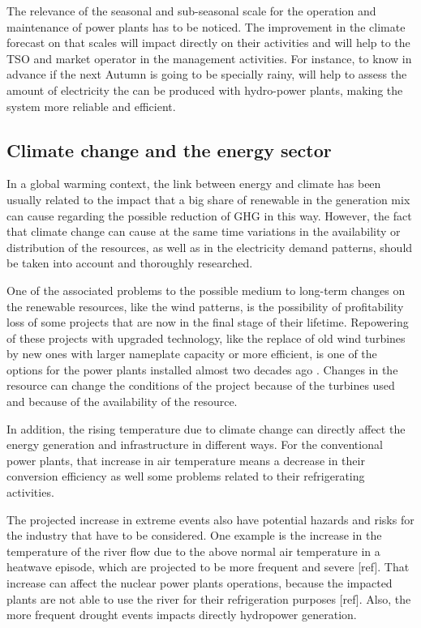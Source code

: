 The relevance of the seasonal and sub-seasonal scale for the operation and maintenance of power plants has to be noticed. The improvement in the climate forecast on that scales will impact directly on their activities and will help to the TSO and market operator in the management activities. For instance, to know in advance if the next Autumn is going to be specially rainy, will help to assess the amount of electricity the can be produced with hydro-power plants, making the system more reliable and efficient.

\subsection{Climate change and the energy sector}

In a global warming context, the link between energy and climate has been usually related to the impact that a big share of renewable in the generation mix can cause regarding the possible reduction of GHG in this way. However, the fact that climate change can cause at the same time variations in the availability or distribution of the resources, as well as in the electricity demand patterns, should be taken into account and thoroughly researched. 

One of the associated problems to the possible medium to long-term changes on the renewable resources, like the wind patterns, is the possibility of profitability loss of some projects that are now in the final stage of their lifetime. Repowering of these projects with upgraded technology, like the replace of old wind turbines by new ones with larger nameplate capacity or more efficient, is one of the options for the power plants installed almost two decades ago \cite*{delrio}. Changes in the resource can change the conditions of the project because of the turbines used and because of the availability of the resource.  



In addition, the rising temperature due to climate change can directly affect the energy generation and infrastructure in different ways. For the conventional power plants, that increase in air temperature means a decrease in their conversion efficiency as well some problems related to their refrigerating activities.

The projected increase in extreme events also have potential hazards and risks for the industry that have to be considered. One example is the increase in the temperature of the river flow due to the above normal air temperature in a heatwave episode, which are projected to be more frequent and severe [ref]. That increase can affect the nuclear power plants operations, because the impacted plants are not able to use the river for their refrigeration purposes [ref]. Also, the more frequent drought events impacts directly hydropower generation.  

